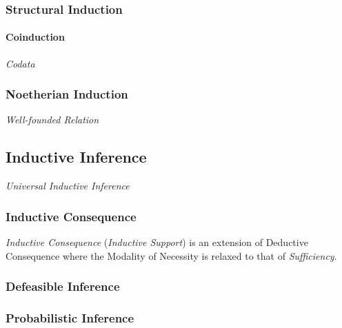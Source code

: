\subsubsection{Structural Induction}\label{sec:structural_induction}

\paragraph{Coinduction}\label{sec:coinduction}

\emph{Codata}



\subsubsection{Noetherian Induction}\label{sec:noetherian_induction}

\emph{Well-founded Relation}



\subsection{Inductive Inference}\label{sec:inductive_inference}
\cite{hawthorne08}

\emph{Universal Inductive Inference}



\subsubsection{Inductive Consequence}\label{sec:inductive_consequence}

\emph{Inductive Consequence} (\emph{Inductive Support}) is an
extension of Deductive Consequence where the Modality of Necessity is
relaxed to that of \emph{Sufficiency}.



\subsubsection{Defeasible Inference}\label{sec:defeasible_inference}

\subsubsection{Probabilistic Inference}\label{sec:probabilistic_inference}


